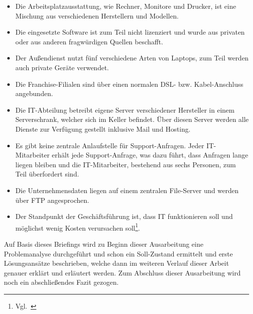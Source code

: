 \begin{itemize}
\item Die Arbeitsplatzausstattung, wie Rechner, Monitore und Drucker,
  ist eine Mischung aus verschiedenen Herstellern und Modellen.
\item Die eingesetzte Software ist zum Teil nicht lizenziert und wurde
  aus privaten oder aus anderen fragwürdigen Quellen beschafft.
\item Der Außendienst nutzt fünf verschiedene Arten von Laptops, zum
  Teil werden auch private Geräte verwendet.
\item Die Franchise-Filialen sind über einen normalen DSL-
  bzw. Kabel-Anschluss angebunden.
\item Die IT-Abteilung betreibt eigene Server verschiedener Hersteller
  in einem Serverschrank, welcher sich im Keller befindet. Über diesen
  Server werden alle Dienste zur Verfügung gestellt inklusive Mail und
  Hosting.
\item Es gibt keine zentrale Anlaufstelle für Support-Anfragen. Jeder
  IT-Mitarbeiter erhält jede Support-Anfrage, was dazu führt, dass
  Anfragen lange liegen bleiben und die IT-Mitarbeiter, bestehend aus
  sechs Personen, zum Teil überfordert sind.
\item Die Unternehmensdaten liegen auf einem zentralen File-Server und
werden über FTP angesprochen.
\item Der Standpunkt der Geschäftsführung ist, dass IT funktionieren
  soll und möglichst wenig Kosten verursachen
  soll\footnote{Vgl.~\cite{ITMS-Briefing}}.
\end{itemize}

Auf Basis dieses Briefings wird zu Beginn dieser Ausarbeitung eine
Problemanalyse durchgeführt und schon ein Soll-Zustand ermittelt und
erste Lösungsansätze beschrieben, welche dann im weiteren Verlauf
dieser Arbeit genauer erklärt und erläutert werden. Zum Abschluss
dieser Ausarbeitung wird noch ein abschließendes Fazit gezogen.
